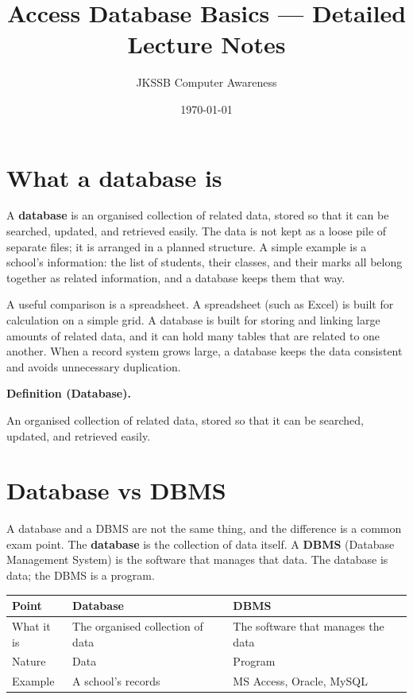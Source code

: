 \documentclass[11pt]{article}
\title{Access Database Basics --- Detailed Lecture Notes}
\author{JKSSB Computer Awareness}
\date{\today}
\newenvironment{definitionbox}[1]{%
  \par\noindent\textbf{Definition (#1).}\ \itshape
}{\par\vspace{0.3em}}
\begin{document}
\maketitle

\section{What a database is}
A \textbf{database} is an organised collection of related data, stored so
that it can be searched, updated, and retrieved easily. The data is not kept
as a loose pile of separate files; it is arranged in a planned structure.
A simple example is a school's information: the list of students, their
classes, and their marks all belong together as related information, and a
database keeps them that way.

A useful comparison is a spreadsheet. A spreadsheet (such as Excel) is built
for calculation on a simple grid. A database is built for storing and linking
large amounts of related data, and it can hold many tables that are related
to one another. When a record system grows large, a database keeps the data
consistent and avoids unnecessary duplication.

\begin{definitionbox}{Database}
An organised collection of related data, stored so that it can be searched,
updated, and retrieved easily.
\end{definitionbox}

\section{Database vs DBMS}
A database and a DBMS are not the same thing, and the difference is a common
exam point. The \textbf{database} is the collection of data itself. A
\textbf{DBMS} (Database Management System) is the software that manages that
data. The database is data; the DBMS is a program.

\begin{center}
\begin{tabular}{p{}p{}p{}}
\toprule
\textbf{Point} & \textbf{Database} & \textbf{DBMS} \\
\midrule
What it is & The organised collection of data & The software that manages the data \\
Nature & Data & Program \\
Example & A school's records & MS Access, Oracle, MySQL \\
\bottomrule
\end{tabular}
\end{center}
\end{document}
